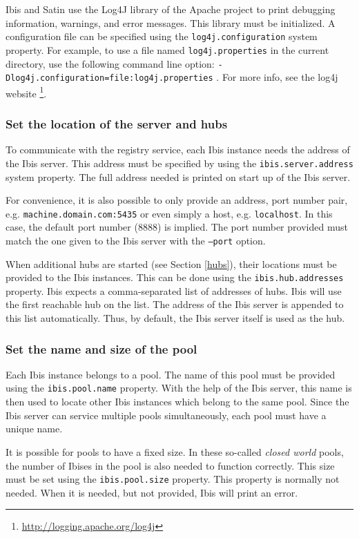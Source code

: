\documentclass[a4paper,10pt]{article}
\begin{document}
Ibis and Satin use the Log4J library of the Apache project to print debugging
information, warnings, and error messages. This library must be
initialized. A configuration file can be specified using the
\texttt{log4j.configuration} system property. For example, to use a file
named \texttt{log4j.properties} in the current directory, use the
following command line option:
\texttt{-Dlog4j.configuration=file:log4j.properties} . For more info,
see the log4j website \footnote{\url{http://logging.apache.org/log4j}}.

\subsubsection{Set the location of the server and hubs}

To communicate with the registry service, each Ibis instance needs the address
of the Ibis server. This address must be specified by using the
\texttt{ibis.server.address} system property. The full address needed is
printed on start up of the Ibis server.

For convenience, it is also possible to only provide an address, port number
pair, e.g. \texttt{machine.domain.com:5435} or even simply a host, e.g.
\texttt{localhost}. In this case, the default port number (8888) is implied.
The port number provided must match the one given to the Ibis server
with the \texttt{--port} option.

When additional hubs are started (see Section \ref{hubs}), their locations
must be provided to the Ibis instances. This can be done using
the \texttt{ibis.hub.addresses} property. Ibis expects a comma-separated
list of addresses of hubs. Ibis will use the first reachable hub on the
list. The address of the Ibis server is appended to this list
automatically. Thus, by default, the Ibis server itself is used as the
hub.

\subsubsection{Set the name and size of the pool}

Each Ibis instance belongs to a pool. The name of this pool must be provided
using the \texttt{ibis.pool.name} property. With the help of the Ibis server,
this name is then used to locate other Ibis instances which belong to the
same pool. Since the Ibis server can service multiple pools simultaneously,
each pool must have a unique name.

It is possible for pools to have a fixed size. In these so-called \emph{closed
world} pools, the number of Ibises in the pool is also needed to function
correctly. This size must be set using the \texttt{ibis.pool.size} property.
This property is normally not needed. When it is needed, but not provided, Ibis
will print an error. 
\end{document}
